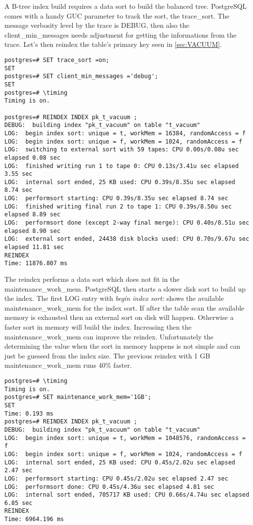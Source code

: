 A B-tree index build requires a data sort to build the balanced tree. PostgreSQL comes with a handy 
GUC parameter to track the sort, the trace\_sort. 
The message verbosity level by the trace is DEBUG, then also the client\_min\_messages needs 
adjustment for getting the informations from the trace. Let's then reindex the table's primary key 
seen in \ref{sec:VACUUM}.

\begin{lstlisting}[style=pgsql]
postgres=# SET trace_sort =on;
SET
postgres=# SET client_min_messages ='debug';
SET
postgres=# \timing
Timing is on.

postgres=# REINDEX INDEX pk_t_vacuum ;
DEBUG:  building index "pk_t_vacuum" on table "t_vacuum"
LOG:  begin index sort: unique = t, workMem = 16384, randomAccess = f
LOG:  begin index sort: unique = f, workMem = 1024, randomAccess = f
LOG:  switching to external sort with 59 tapes: CPU 0.00s/0.08u sec elapsed 0.08 sec
LOG:  finished writing run 1 to tape 0: CPU 0.13s/3.41u sec elapsed 3.55 sec
LOG:  internal sort ended, 25 KB used: CPU 0.39s/8.35u sec elapsed 8.74 sec
LOG:  performsort starting: CPU 0.39s/8.35u sec elapsed 8.74 sec
LOG:  finished writing final run 2 to tape 1: CPU 0.39s/8.50u sec elapsed 8.89 sec
LOG:  performsort done (except 2-way final merge): CPU 0.40s/8.51u sec elapsed 8.90 sec
LOG:  external sort ended, 24438 disk blocks used: CPU 0.70s/9.67u sec elapsed 11.81 sec
REINDEX
Time: 11876.807 ms

\end{lstlisting}

The reindex performs a data sort which does not fit in the maintenance\_work\_mem. PostgreSQL then 
starts a slower disk sort to build up the index. The first LOG entry with \textit{begin index 
sort:} shows the available maintenance\_work\_mem for the index sort. If after the table scan the 
available memory is exhausted then an external sort on disk will happen. Otherwise a faster sort in 
memory will build the index. Increasing then the maintenance\_work\_mem  can improve the reindex. 
Unfortunately the determining the value when the sort in memory happens is not simple and can just 
be guessed from the index size. The previous reindex with 1 GB maintenance\_work\_mem runs 40\% 
faster.

\begin{lstlisting}[style=pgsql]
postgres=# \timing
Timing is on.
postgres=# SET maintenance_work_mem='1GB';
SET
Time: 0.193 ms
postgres=# REINDEX INDEX pk_t_vacuum ;
DEBUG:  building index "pk_t_vacuum" on table "t_vacuum"
LOG:  begin index sort: unique = t, workMem = 1048576, randomAccess = f
LOG:  begin index sort: unique = f, workMem = 1024, randomAccess = f
LOG:  internal sort ended, 25 KB used: CPU 0.45s/2.02u sec elapsed 2.47 sec
LOG:  performsort starting: CPU 0.45s/2.02u sec elapsed 2.47 sec
LOG:  performsort done: CPU 0.45s/4.36u sec elapsed 4.81 sec
LOG:  internal sort ended, 705717 KB used: CPU 0.66s/4.74u sec elapsed 6.85 sec
REINDEX
Time: 6964.196 ms


\end{lstlisting}

